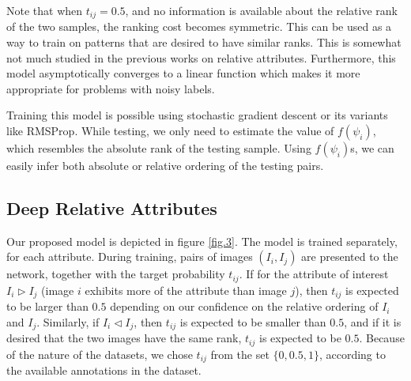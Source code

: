 \documentclass[runningheads]{llncs}
\begin{document}
Note that when $t_{ij} = 0.5$, and no information is available about the relative rank of the two samples, the ranking cost becomes symmetric. This can be used as a way to train on patterns that are desired to have similar ranks. This is somewhat not much studied in the previous works on relative attributes.
Furthermore, this model asymptotically converges to a linear function which makes it more appropriate for problems with noisy labels. %

Training this model is possible using stochastic gradient descent or its variants like RMSProp.
While testing, we only need to estimate the value of $f(\psi_i)$, which resembles the absolute rank of the testing sample. Using $f(\psi_i)$s, we can easily infer both absolute or relative ordering of the testing pairs.


\subsection{Deep Relative Attributes}\label{sec3.2}


Our proposed model is depicted in figure \ref{fig.3}. The model is trained separately, for each attribute. During training, pairs of images $(I_i, I_j)$ are presented to the network, together with the target probability $t_{ij}$. If for the attribute of interest $I_i \triangleright I_j$ (image $i$ exhibits more of the attribute than image $j$), then $t_{ij}$ is expected to be larger than $0.5$ depending on our confidence on the relative ordering of $I_i$ and $I_j$. Similarly, if $I_i \triangleleft I_j$, then $t_{ij}$ is expected to be smaller than $0.5$, and if it is desired that the two images have the same rank, $t_{ij}$ is expected to be $0.5$. Because of the nature of the datasets, we chose $t_{ij}$ from the set $\{0, 0.5, 1 \}$, according to the available annotations in the dataset.
\end{document}
